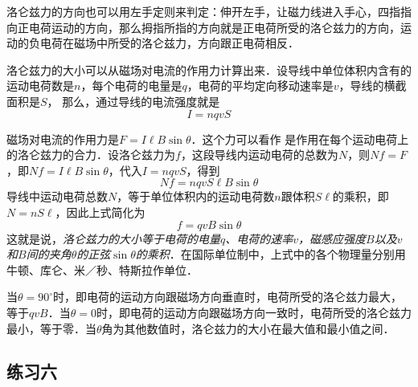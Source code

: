 洛仑兹力的方向也可以用左手定则来判定：伸开左手，让磁力线进入手心，四指指向正电荷运动的方向，那么拇指所指的方向就是正电荷所受的洛仑兹力的方向，运动的负电荷在磁场中所受的洛仑兹力，方向跟正电荷相反．

洛仑兹力的大小可以从磁场对电流的作用力计算出来．设导线中单位体积内含有的运动电荷数是$n$，每个电荷的电量是$q$，电荷的平均定向移动速率是$v$，导线的横截面积是$S$，
那么，通过导线的电流强度就是
\[I=nqvS\]

磁场对电流的作用力是$F=I\ell B\sin\theta$．这个力可以看作
是作用在每个运动电荷上的洛仑兹力的合力．设洛仑兹力为$f$，这段导线内运动电荷的总数为$N$，则$Nf=F$，即$Nf=I\ell B\sin\theta$，代入$I=nqvS$，得到
\[Nf=nqvS\ell B\sin\theta \]
导线中运动电荷总数$N$，等于单位体积内的运动电荷数$n$跟体积$S\ell$的乘积，即$N=nS\ell$，因此上式简化为
\[f=qvB\sin\theta \]
这就是说，\textit{洛仑兹力的大小等于电荷的电量$q$、电荷的速率$v$，磁感应强度$B$以及$v$和$B$间的夹角$\theta$的正弦$\sin\theta$的乘积}．在国际单位制中，上式中的各个物理量分别用牛顿、库仑、米／秒、特斯拉作单位．

当$\theta=90^{\circ}$时，即电荷的运动方向跟磁场方向垂直时，电荷所受的洛仑兹力最大，等于$qvB$．当$\theta=0$时，即电荷的运动方向跟磁场方向一致时，电荷所受的洛仑兹力最小，等于零．当$\theta$角为其他数值时，洛仑兹力的大小在最大值和最小值之间．

\subsection*{练习六}

